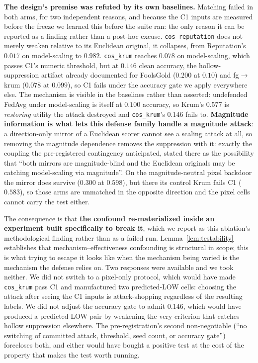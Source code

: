 \documentclass{article}
\begin{document}
\textbf{The design's premise was refuted by its own baselines.} Matching failed in both arms, for two independent reasons, and because the C1 inputs are measured before the freeze we learned this before the suite ran: the only reason it can be reported as a finding rather than a post-hoc excuse. \texttt{cos\_reputation} does not merely weaken relative to its Euclidean original, it collapses, from Reputation's $0.017$ on model-scaling to $\mathbf{0.982}$. \texttt{cos\_krum} reaches $0.078$ on model-scaling, which passes C1's numeric threshold, but at $\mathbf{0.146}$ clean accuracy, the hollow-suppression artifact already documented for FoolsGold ($0.200$ at $0.10$) and fg$\to$krum ($0.078$ at $0.099$), so C1 fails under the accuracy gate we apply everywhere else. The mechanism is visible in the baselines rather than asserted: undefended FedAvg under model-scaling is itself at $0.100$ accuracy, so Krum's $0.577$ is \emph{restoring} utility the attack destroyed and \texttt{cos\_krum}'s $0.146$ fails to. \textbf{Magnitude information is what lets this defense family handle a magnitude attack}: a direction-only mirror of a Euclidean scorer cannot see a scaling attack at all, so removing the magnitude dependence removes the suppression with it: exactly the coupling the pre-registered contingency anticipated, stated there as the possibility that ``both mirrors are magnitude-blind and the Euclidean originals may be catching model-scaling via magnitude''. On the magnitude-neutral pixel backdoor the mirror does survive ($0.300$ at $0.598$), but there its control Krum fails C1 ($0.583$), so those arms are unmatched in the opposite direction and the pixel cells cannot carry the test either.

The consequence is that \textbf{the confound re-materialized inside an experiment built specifically to break it}, which we report as this ablation's methodological finding rather than as a failed run. Lemma~\ref{lem:testability} establishes that mechanism--effectiveness confounding is structural in scope; this is what trying to escape it looks like when the mechanism being varied is the mechanism the defense relies on. Two responses were available and we took neither. We did not switch to a pixel-only protocol, which would have made \texttt{cos\_krum} pass C1 and manufactured two predicted-LOW cells: choosing the attack after seeing the C1 inputs is attack-shopping regardless of the resulting labels. We did not adjust the accuracy gate to admit $0.146$, which would have produced a predicted-LOW pair by weakening the very criterion that catches hollow suppression elsewhere. The pre-registration's second non-negotiable (``no switching of committed attack, threshold, seed count, or accuracy gate'') forecloses both, and either would have bought a positive test at the cost of the property that makes the test worth running.
\end{document}
